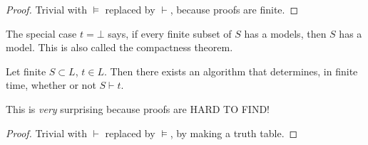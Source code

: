 \documentclass[a4paper]{article}
\begin{document}
\begin{proof}
  Trivial with $\models$ replaced by $\vdash$, because proofs are finite.
\end{proof}
The special case $t = \bot$ says, if every finite subset of $S$ has a models, then $S$ has a model. This is also called the compactness theorem.

\begin{cor}
  Let finite $S\subset L$, $t\in L$. Then there exists an algorithm that determines, in finite time, whether or not $S\vdash t$.
\end{cor}
This is \emph{very} surprising because proofs are HARD TO FIND!
\begin{proof}
  Trivial with $\vdash$ replaced by $\models$, by making a truth table.
\end{proof}
\end{document}
